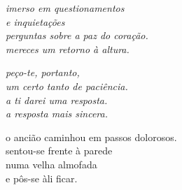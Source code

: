 \emph{imerso em questionamentos\\
e inquietações\\
perguntas sobre a paz do coração.\\
mereces um retorno à altura.}

\emph{peço-te, portanto,\\
um certo tanto de paciência.\\
a ti darei uma resposta.\\
a resposta mais sincera.}

o ancião caminhou em passos dolorosos.\\
sentou-se frente à parede\\
numa velha almofada\\
e pôs-se àli ficar.
